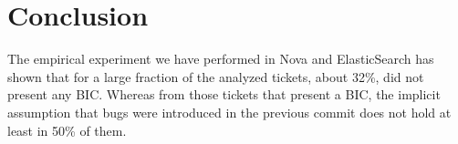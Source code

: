 \documentclass[conference]{IEEEtran}
\begin{document}

%
%

\section{Conclusion}
The empirical experiment we have performed in Nova and ElasticSearch has shown that for a large fraction of the analyzed tickets, about 32\%, did not present any BIC. Whereas from those tickets that present a BIC, the implicit assumption that bugs were introduced in the previous commit does not hold at least in 50\% of them.
\end{document}
